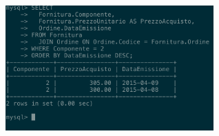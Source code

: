\begin{description}
              \begin{figure}[H]
                \centering
                \includegraphics[width=8cm]{images/screenshots/stats_costi.png}
              \end{figure}

          \end{description}
